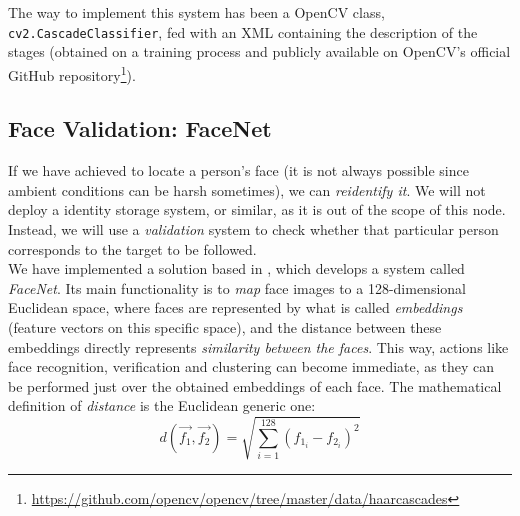 		The way to implement this system has been a OpenCV class, \texttt{cv2.CascadeClassifier}, fed with an XML containing the description of the stages (obtained on a training process and publicly available on OpenCV's official GitHub repository\footnote{\url{https://github.com/opencv/opencv/tree/master/data/haarcascades}}).
	
	\subsection{Face Validation: FaceNet}
		If we have achieved to locate a person's face (it is not always possible since ambient conditions can be harsh sometimes), we can \emph{reidentify it}. We will not deploy a identity storage system, or similar, as it is out of the scope of this node. Instead, we will use a \emph{validation} system to check whether that particular person corresponds to the target to be followed.\\
		
		We have implemented a solution based in \cite{facenet}, which develops a system called \emph{FaceNet}. Its main functionality is to \emph{map} face images to a 128-dimensional Euclidean space, where faces are represented by what is called \emph{embeddings} (feature vectors on this specific space), and the distance between these embeddings directly represents \emph{similarity between the faces}. This way, actions like face recognition, verification and clustering can become immediate, as they can be performed just over the obtained embeddings of each face. The mathematical definition of \emph{distance} is the Euclidean generic one:
		\begin{equation}
			d(\vec{f_1}, \vec{f_2}) = \sqrt{\sum_{i=1}^{128}(f_{1_i} - f_{2_i})^2}
			\label{eqn:6_l2}
		\end{equation}
		
